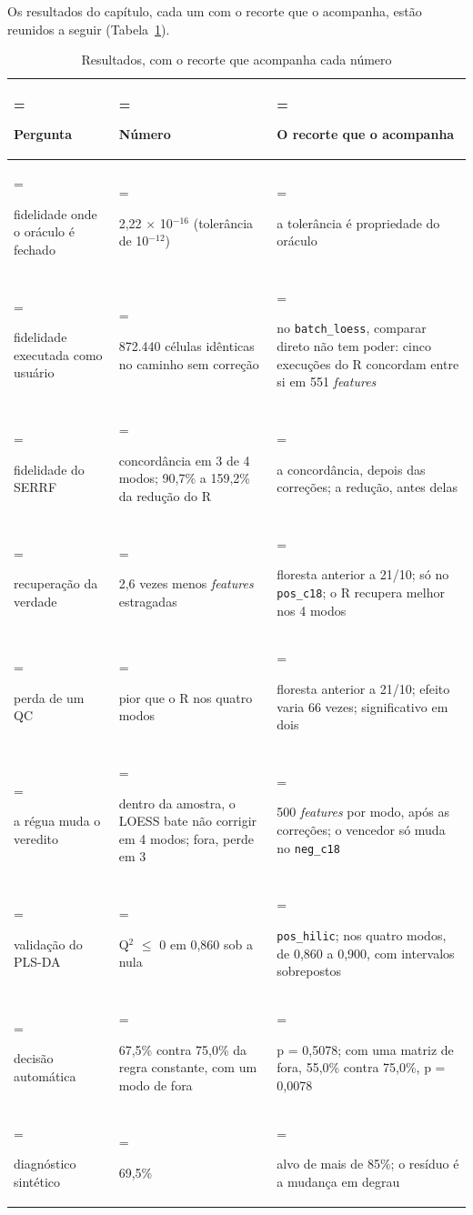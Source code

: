 Os resultados do capítulo, cada um com o recorte que o acompanha, estão reunidos a seguir (Tabela~\ref{qua:5-2}).

\begin{table}[htbp]
\centering
\caption{Resultados, com o recorte que acompanha cada número}\label{qua:5-2}
\normalsize
\begin{tabularx}{\linewidth}{|>{\hsize=0.68\hsize\linewidth=\hsize\raggedright\arraybackslash\hspace{0pt}}X|>{\hsize=1.16\hsize\linewidth=\hsize\raggedright\arraybackslash\hspace{0pt}}X|>{\hsize=1.16\hsize\linewidth=\hsize\raggedright\arraybackslash\hspace{0pt}}X|}
\hline
\textbf{Pergunta} & \textbf{Número} & \textbf{O recorte que o acompanha} \\
\hline
fidelidade onde o oráculo é fechado & 2,22 $\times$ 10$^{-16}$ (tolerância de 10$^{-12}$) & a tolerância é propriedade do oráculo \\ \hline
fidelidade executada como usuário & 872.440 células idênticas no caminho sem correção & no \texttt{batch\_\allowbreak{}loess}, comparar direto não tem poder: cinco execuções do R concordam entre si em 551 \textit{features} \\ \hline
fidelidade do SERRF & concordância em 3 de 4 modos; 90,7\% a 159,2\% da redução do R & a concordância, depois das correções; a redução, antes delas \\ \hline
recuperação da verdade & 2,6 vezes menos \textit{features} estragadas & floresta anterior a 21/10; só no \texttt{pos\_\allowbreak{}c18}; o R recupera melhor nos 4 modos \\ \hline
perda de um QC & pior que o R nos quatro modos & floresta anterior a 21/10; efeito varia 66 vezes; significativo em dois \\ \hline
a régua muda o veredito & dentro da amostra, o LOESS bate não corrigir em 4 modos; fora, perde em 3 & 500 \textit{features} por modo, após as correções; o vencedor só muda no \texttt{neg\_\allowbreak{}c18} \\ \hline
validação do PLS-DA & Q$^{2}$ $\leq$ 0 em 0,860 sob a nula & \texttt{pos\_\allowbreak{}hilic}; nos quatro modos, de 0,860 a 0,900, com intervalos sobrepostos \\ \hline
decisão automática & 67,5\% contra 75,0\% da regra constante, com um modo de fora & p = 0,5078; com uma matriz de fora, 55,0\% contra 75,0\%, p = 0,0078 \\ \hline
diagnóstico sintético & 69,5\% & alvo de mais de 85\%; o resíduo é a mudança em degrau \\ \hline

\end{tabularx}
\end{table}
